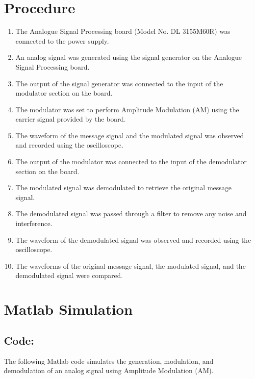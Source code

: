 \documentclass[12pt]{article}
\begin{document}
\section*{Procedure}
\begin{enumerate}
    \item The Analogue Signal Processing board (Model No. DL 3155M60R) was connected to the power supply.
    \item An analog signal was generated using the signal generator on the Analogue Signal Processing board.
    \item The output of the signal generator was connected to the input of the modulator section on the board.
    \item The modulator was set to perform Amplitude Modulation (AM) using the carrier signal provided by the board.
    \item The waveform of the message signal and the modulated signal was observed and recorded using the oscilloscope.
    \item The output of the modulator was connected to the input of the demodulator section on the board.
    \item The modulated signal was demodulated to retrieve the original message signal.
    \item The demodulated signal was passed through a filter to remove any noise and interference.
    \item The waveform of the demodulated signal was observed and recorded using the oscilloscope.
    \item The waveforms of the original message signal, the modulated signal, and the demodulated signal were compared.
\end{enumerate}

\section*{Matlab Simulation}

\subsection*{Code:}
The following Matlab code simulates the generation, modulation, and demodulation of an analog signal using Amplitude Modulation (AM).

\inputminted[linenos,breaklines,breakanywhere]{matlab}{./assets/analogMod.m}
\end{document}
